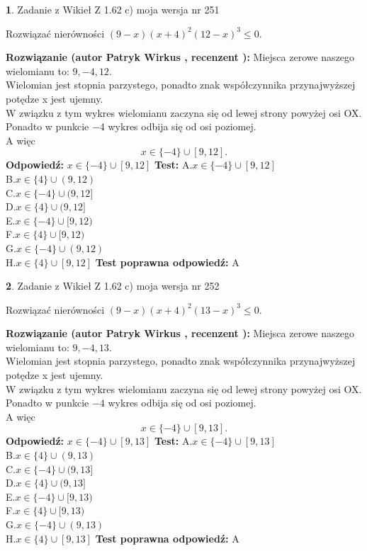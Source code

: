 \documentclass[12pt, a4paper]{article}
\theoremstyle{definition} %
\newtheorem{zad}{}
\newcommand{\zadStart}[1]{\begin{zad}#1\newline}
\newcommand{\zadStop}{\end{zad}}
\newcommand{\rozwStart}[2]{\noindent \textbf{Rozwiązanie (autor #1 , recenzent #2): }\newline}
\newcommand{\rozwStop}{\newline}
\newcommand{\odpStart}{\noindent \textbf{Odpowiedź:}\newline}
\newcommand{\odpStop}{\newline}
\newcommand{\testStart}{\noindent \textbf{Test:}\newline}
\newcommand{\testStop}{\newline}
\newcommand{\kluczStart}{\noindent \textbf{Test poprawna odpowiedź:}\newline}
\newcommand{\kluczStop}{\newline}
\begin{document}
\zadStart{Zadanie z Wikieł Z 1.62 c) moja wersja nr 251}

Rozwiązać nierówności $(9-x)(x+4)^{2}(12-x)^{3}\le0$.
\zadStop
\rozwStart{Patryk Wirkus}{}
Miejsca zerowe naszego wielomianu to: $9, -4, 12$.\\
Wielomian jest stopnia parzystego, ponadto znak współczynnika przy\linebreak najwyższej potędze x jest ujemny.\\ W związku z tym wykres wielomianu zaczyna się od lewej strony powyżej osi OX.\\
Ponadto w punkcie $-4$ wykres odbija się od osi poziomej.\\
A więc $$x \in \{-4\} \cup [9,12].$$
\rozwStop
\odpStart
$x \in \{-4\} \cup [9,12]$
\odpStop
\testStart
A.$x \in \{-4\} \cup [9,12]$\\
B.$x \in \{4\} \cup (9,12)$\\
C.$x \in \{-4\} \cup (9,12]$\\
D.$x \in \{4\} \cup (9,12]$\\
E.$x \in \{-4\} \cup [9,12)$\\
F.$x \in \{4\} \cup [9,12)$\\
G.$x \in \{-4\} \cup (9,12)$\\
H.$x \in \{4\} \cup [9,12]$
\testStop
\kluczStart
A
\kluczStop



\zadStart{Zadanie z Wikieł Z 1.62 c) moja wersja nr 252}

Rozwiązać nierówności $(9-x)(x+4)^{2}(13-x)^{3}\le0$.
\zadStop
\rozwStart{Patryk Wirkus}{}
Miejsca zerowe naszego wielomianu to: $9, -4, 13$.\\
Wielomian jest stopnia parzystego, ponadto znak współczynnika przy\linebreak najwyższej potędze x jest ujemny.\\ W związku z tym wykres wielomianu zaczyna się od lewej strony powyżej osi OX.\\
Ponadto w punkcie $-4$ wykres odbija się od osi poziomej.\\
A więc $$x \in \{-4\} \cup [9,13].$$
\rozwStop
\odpStart
$x \in \{-4\} \cup [9,13]$
\odpStop
\testStart
A.$x \in \{-4\} \cup [9,13]$\\
B.$x \in \{4\} \cup (9,13)$\\
C.$x \in \{-4\} \cup (9,13]$\\
D.$x \in \{4\} \cup (9,13]$\\
E.$x \in \{-4\} \cup [9,13)$\\
F.$x \in \{4\} \cup [9,13)$\\
G.$x \in \{-4\} \cup (9,13)$\\
H.$x \in \{4\} \cup [9,13]$
\testStop
\kluczStart
A
\kluczStop
\end{document}
